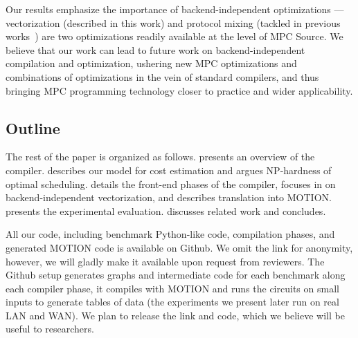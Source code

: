 Our results emphasize the importance of backend-independent optimizations --- vectorization (described in this work) and protocol mixing (tackled in previous works~\cite{CCS:BDKKS18,Ishaq:2019, Fang:2022}) are two optimizations readily available at the level of MPC Source. We believe that our work can lead to future work on backend-independent compilation and optimization, ushering new MPC optimizations and combinations of optimizations in the vein of standard compilers, and thus bringing MPC programming technology closer to practice and wider applicability.

\subsection{Outline}

The rest of the paper is organized as follows.  presents an overview of the compiler.  describes our model for cost estimation and argues NP-hardness of optimal scheduling.  details the front-end phases of the compiler,  focuses in on backend-independent vectorization, and  describes translation into MOTION.  presents the experimental evaluation. discusses related work and  concludes.

All our code, including benchmark Python-like code, compilation phases, and generated MOTION code is available on Github. We omit the link for anonymity, 
however, we will gladly make it available upon request from reviewers. The Github setup generates graphs and intermediate code for each benchmark along each compiler phase, it compiles with 
MOTION and runs the circuits on small inputs to generate tables of data (the experiments we present later run on real LAN and WAN). We plan to release the link and code, which we believe will be useful to researchers.

